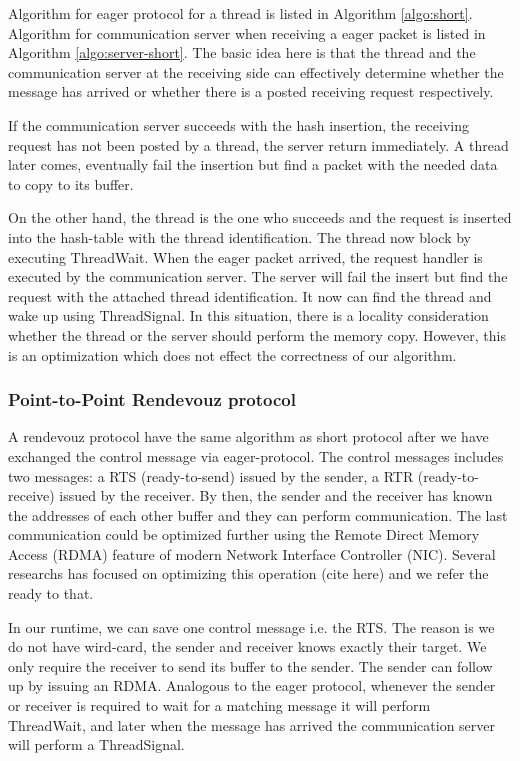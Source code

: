 \documentclass[11pt]{article}
\begin{document}
Algorithm for eager protocol for a thread is listed in Algorithm
\ref{algo:short}. Algorithm for communication server when receiving a eager 
packet is listed in Algorithm \ref{algo:server-short}. The basic idea here is
that the thread and the communication server at the receiving side can effectively
determine whether the message has arrived or whether there is a posted receiving
request respectively.

If the communication server succeeds with the hash insertion, the receiving
request has not been posted by a thread, the server return immediately. A
thread later comes, eventually fail the insertion but find a packet
with the needed data to copy to its buffer.

On the other hand, the thread is the one who succeeds and the request is
inserted into the hash-table with the thread identification. The thread now
block by executing ThreadWait. When the eager packet arrived, the request handler
is executed by the communication server. The server will fail the insert but
find the request with the attached thread identification. It now can 
find the thread and wake up using ThreadSignal. In this situation, there is a
locality consideration whether the thread or the server should perform the
memory copy. However, this is an optimization which does not effect the
correctness of our algorithm.

\subsubsection{Point-to-Point Rendevouz protocol}
A rendevouz protocol have the same algorithm as short protocol after we have
exchanged the control message via eager-protocol. The control messages 
includes two messages: a RTS (ready-to-send) issued by the sender, a RTR
(ready-to-receive) issued by the receiver. By then, the sender and the receiver
has known the addresses of each other buffer and they can perform
communication.  The last communication could be optimized further using the
Remote Direct Memory Access (RDMA) feature of modern Network Interface
Controller (NIC).  Several researchs has focused on optimizing this operation
(cite here) and we refer the ready to that.

In our runtime, we can save one control message i.e. the RTS.  The reason is
we do not have wird-card, the sender and receiver knows exactly their target.
We only require the receiver to send its buffer to the sender. The sender can
follow up by issuing an RDMA.  Analogous to the eager protocol, whenever the
sender or receiver is required to wait for a matching message it will perform
ThreadWait, and later when the message has arrived the communication server
will perform a ThreadSignal.
\end{document}
